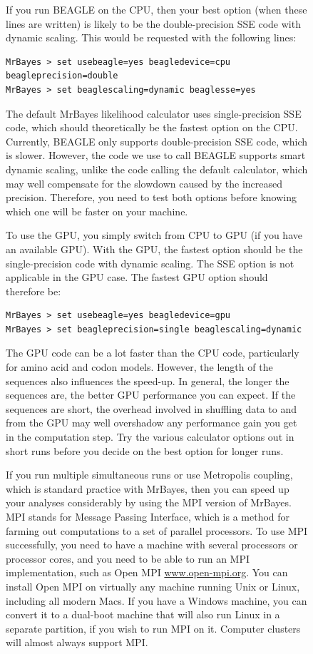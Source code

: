 \documentclass[12pt]{book}
\begin{document}
\begin{figure}[h]
If you run BEAGLE on the CPU, then your best option (when these lines are written) is likely to be
the double-precision SSE code with dynamic scaling. This would be requested with the following
lines:

\small
\begin{verbatim}
MrBayes > set usebeagle=yes beagledevice=cpu beagleprecision=double
MrBayes > set beaglescaling=dynamic beaglesse=yes
\end{verbatim}
\normalsize

The default MrBayes likelihood calculator uses single-precision SSE code, which should
theoretically be the fastest option on the CPU. Currently, BEAGLE only supports double-precision
SSE code, which is slower. However, the code we use to call BEAGLE supports smart dynamic scaling,
unlike the code calling the default calculator, which may well compensate for the slowdown caused
by the increased precision. Therefore, you need to test both options before knowing which one will
be faster on your machine.

To use the GPU, you simply switch from CPU to GPU (if you have an available GPU). With the GPU, the
fastest option should be the single-precision code with dynamic scaling. The SSE option is not
applicable in the GPU case. The fastest GPU option should therefore be:

\small
\begin{verbatim}
MrBayes > set usebeagle=yes beagledevice=gpu
MrBayes > set beagleprecision=single beaglescaling=dynamic
\end{verbatim}
\normalsize

The GPU code can be a lot faster than the CPU code, particularly for amino acid and codon models.
However, the length of the sequences also influences the speed-up. In general, the longer the
sequences are, the better GPU performance you can expect. If the sequences are short, the overhead
involved in shuffling data to and from the GPU may well overshadow any performance gain you get in
the computation step. Try the various calculator options out in short runs before you decide on the
best option for longer runs.

If you run multiple simultaneous runs or use Metropolis coupling, which is standard practice with
MrBayes, then you can speed up your analyses considerably by using the MPI version of MrBayes. MPI
stands for Message Passing Interface, which is a method for farming out computations to a set of
parallel processors. To use MPI successfully, you need to have a machine with several processors
or processor cores, and you need to be able to run an MPI implementation, such as Open MPI
\url{www.open-mpi.org}. You can install Open MPI on virtually any machine running Unix or Linux,
including all modern Macs. If you have a Windows machine, you can convert it to a dual-boot machine
that will also run Linux in a separate partition, if you wish to run MPI on it. Computer clusters
will almost always support MPI.


\end{figure}
\end{document}
